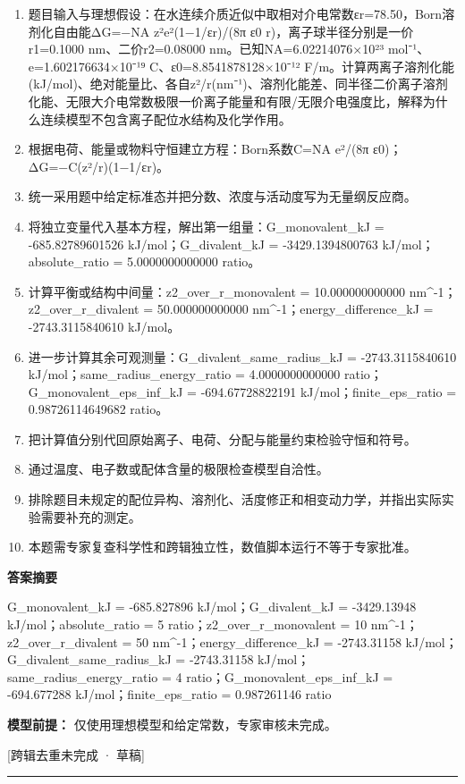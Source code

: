 \documentclass[UTF8,11pt,a4paper]{ctexart}
\begin{document}
\begin{enumerate}
\item 题目输入与理想假设：在水连续介质近似中取相对介电常数εr=78.50，Born溶剂化自由能ΔG=−NA z²e²(1−1/εr)/(8π ε0 r)，离子球半径分别是一价r1=0.1000 nm、二价r2=0.08000 nm。已知NA=6.02214076×10²³ mol⁻¹、e=1.602176634×10⁻¹⁹ C、ε0=8.8541878128×10⁻¹² F/m。计算两离子溶剂化能(kJ/mol)、绝对能量比、各自z²/r(nm⁻¹)、溶剂化能差、同半径二价离子溶剂化能、无限大介电常数极限一价离子能量和有限/无限介电强度比，解释为什么连续模型不包含离子配位水结构及化学作用。
\item 根据电荷、能量或物料守恒建立方程：Born系数C=NA e²/(8π ε0)；ΔG=−C(z²/r)(1−1/εr)。
\item 统一采用题中给定标准态并把分数、浓度与活动度写为无量纲反应商。
\item 将独立变量代入基本方程，解出第一组量：G\_monovalent\_kJ = -685.82789601526 kJ/mol；G\_divalent\_kJ = -3429.1394800763 kJ/mol；absolute\_ratio = 5.0000000000000 ratio。
\item 计算平衡或结构中间量：z2\_over\_r\_monovalent = 10.000000000000 nm\textasciicircum{}-1；z2\_over\_r\_divalent = 50.000000000000 nm\textasciicircum{}-1；energy\_difference\_kJ = -2743.3115840610 kJ/mol。
\item 进一步计算其余可观测量：G\_divalent\_same\_radius\_kJ = -2743.3115840610 kJ/mol；same\_radius\_energy\_ratio = 4.0000000000000 ratio；G\_monovalent\_eps\_inf\_kJ = -694.67728822191 kJ/mol；finite\_eps\_ratio = 0.98726114649682 ratio。
\item 把计算值分别代回原始离子、电荷、分配与能量约束检验守恒和符号。
\item 通过温度、电子数或配体含量的极限检查模型自洽性。
\item 排除题目未规定的配位异构、溶剂化、活度修正和相变动力学，并指出实际实验需要补充的测定。
\item 本题需专家复查科学性和跨辑独立性，数值脚本运行不等于专家批准。
\end{enumerate}
\noindent\textbf{答案摘要}\par
G\_monovalent\_kJ = -685.827896 kJ/mol；G\_divalent\_kJ = -3429.13948 kJ/mol；absolute\_ratio = 5 ratio；z2\_over\_r\_monovalent = 10 nm\textasciicircum{}-1；z2\_over\_r\_divalent = 50 nm\textasciicircum{}-1；energy\_difference\_kJ = -2743.31158 kJ/mol；G\_divalent\_same\_radius\_kJ = -2743.31158 kJ/mol；same\_radius\_energy\_ratio = 4 ratio；G\_monovalent\_eps\_inf\_kJ = -694.677288 kJ/mol；finite\_eps\_ratio = 0.987261146 ratio\par
\noindent\textbf{模型前提：}
仅使用理想模型和给定常数，专家审核未完成。\par
\noindent\textcolor{red!65!black}{[跨辑去重未完成 · 草稿]} \par
\medskip\hrule\medskip
{}
\end{document}
